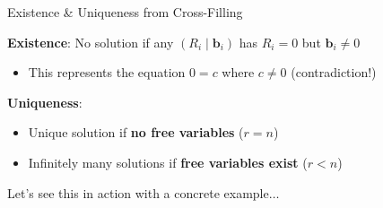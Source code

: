 \documentclass[10pt]{beamer}
\theoremstyle{definition}
\newcommand{\x}[1]{\alert{\textbf{#1}}}
\begin{document}
\begin{frame}{Existence \& Uniqueness from Cross-Filling}

\x{Existence}: No solution if any $(R_i \mid \mathbf{b}_i)$ has $R_i = 0$ but $\mathbf{b}_i \neq 0$

\begin{itemize}
\item This represents the equation $0 = c$ where $c \neq 0$ (contradiction!)
\end{itemize}

\vspace{1em}

\x{Uniqueness}:
\begin{itemize}
\item Unique solution if \textbf{no free variables} ($r = n$)
\item Infinitely many solutions if \textbf{free variables exist} ($r < n$)
\end{itemize}

\vspace{1em}

Let's see this in action with a concrete example$\ldots$

\end{frame}
\end{document}
